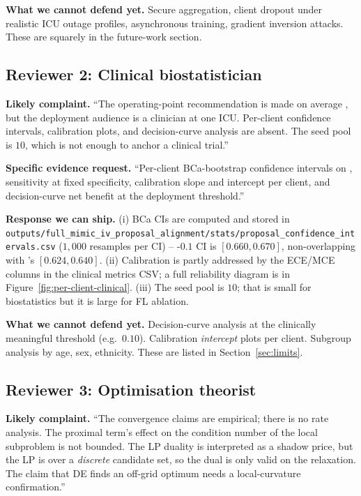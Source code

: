 \textbf{What we cannot defend yet.} Secure aggregation, client
dropout under realistic ICU outage profiles, asynchronous training,
gradient inversion attacks. These are squarely in the future-work
section.

\subsection{Reviewer 2: Clinical biostatistician}
\textbf{Likely complaint.} ``The operating-point recommendation is
made on average \auprc{}, but the deployment audience is a clinician
at one ICU. Per-client confidence intervals, calibration plots, and
decision-curve analysis are absent. The seed pool is $10$, which is
not enough to anchor a clinical trial.''

\textbf{Specific evidence request.} ``Per-client BCa-bootstrap
confidence intervals on \auprc{}, sensitivity at fixed specificity,
calibration slope and intercept per client, and decision-curve net
benefit at the deployment threshold.''

\textbf{Response we can ship.} (i) BCa CIs are computed and stored in
\texttt{outputs/full\_mimic\_iv\_proposal\_alignment/stats/proposal\_confidence\_intervals.csv}
($1{,}000$ resamples per CI) -- \fedprox{}-$0.1$ \auprc{} CI is
$[0.660, 0.670]$, non-overlapping with \fedavg{}'s $[0.624, 0.640]$.
(ii) Calibration is partly addressed by the ECE/MCE columns in the
clinical metrics CSV; a full reliability diagram is in
Figure~\ref{fig:per-client-clinical}. (iii) The seed pool is $10$;
that is small for biostatistics but it is large for FL ablation.

\textbf{What we cannot defend yet.} Decision-curve analysis at the
clinically meaningful threshold (e.g.\ $0.10$). Calibration
\emph{intercept} plots per client. Subgroup analysis by age, sex,
ethnicity. These are listed in Section~\ref{sec:limits}.

\subsection{Reviewer 3: Optimisation theorist}
\textbf{Likely complaint.} ``The convergence claims are empirical;
there is no rate analysis. The proximal term's effect on the
condition number of the local subproblem is not bounded. The LP
duality is interpreted as a shadow price, but the LP is over a
\emph{discrete} candidate set, so the dual is only valid on the
relaxation. The claim that DE finds an off-grid optimum needs a
local-curvature confirmation.''

